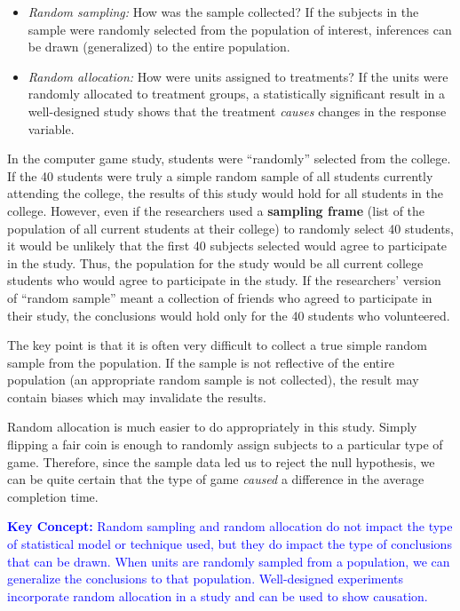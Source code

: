 \documentclass[
]{book}
\begin{document}
\begin{itemize}
\item
  \emph{Random sampling:} How was the sample collected? If the subjects in the sample were randomly selected from the population of interest, inferences can be drawn (generalized) to the entire population.
\item
  \emph{Random allocation:} How were units assigned to treatments? If the units were randomly allocated to treatment groups, a statistically significant result in a well-designed study shows that the treatment \emph{causes} changes in the response variable.
\end{itemize}

In the computer game study, students were ``randomly'' selected from the college. If the 40 students were truly a simple random sample of all students currently attending the college, the results of this study would hold for all students in the college. However, even if the researchers used a \textbf{sampling frame} (list of the population of all current students at their college) to randomly select 40 students, it would be unlikely that the first 40 subjects selected would agree to participate in the study. Thus, the population for the study would be all current college students who would agree to participate in the study. If the researchers' version of ``random sample'' meant a collection of friends who agreed to participate in their study, the conclusions would hold only for the 40 students who volunteered.

The key point is that it is often very difficult to collect a true simple random sample from the population. If the sample is not reflective of the entire population (an appropriate random sample is not collected), the result may contain biases which may invalidate the results.

Random allocation is much easier to do appropriately in this study. Simply flipping a fair coin is enough to randomly assign subjects to a particular type of game. Therefore, since the sample data led us to reject the null hypothesis, we can be quite certain that the type of game \emph{caused} a difference in the average completion time.

\textbf{\textcolor{blue}{Key Concept:}} \textcolor{blue}{Random sampling and random allocation do not impact the type of statistical model or technique used, but they do impact the type of conclusions that can be drawn. When units are randomly sampled from a population, we can generalize the conclusions to that population. Well-designed experiments incorporate random allocation in a study and can be used to show causation.}
\end{document}
